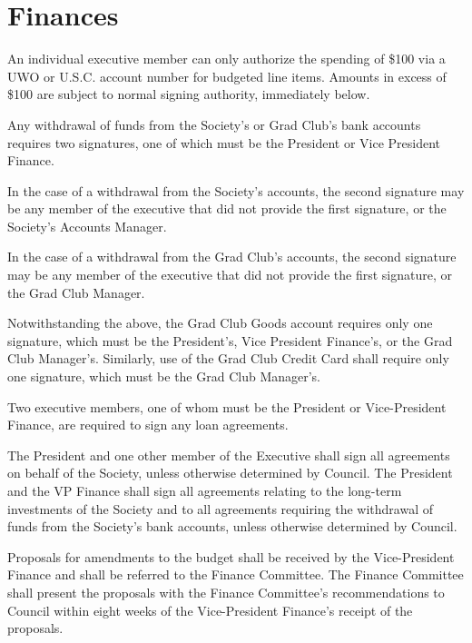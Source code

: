 \section{Finances}
\begin{longenum}[ label*=\thesection.\arabic*., align=left]
	\item An individual executive member can only authorize the spending of \$100 via a  UWO or U.S.C. account number for budgeted line items. Amounts in excess of \$100 are subject to normal signing authority, immediately below.
    \item Any withdrawal of funds from the Society's or Grad Club's bank accounts requires two signatures, one of which must be the President or Vice  President Finance.
    \begin{longenum}[ label*=\arabic*., align=left]
    	\item In the case of a withdrawal from the Society's accounts, the second signature may be any member of the executive that did not provide the first signature, or the Society's Accounts Manager. 
        \item In the case of a withdrawal from the Grad Club's accounts, the second signature may be any member of the executive that did not provide the first signature, or the Grad Club Manager.
    \end{longenum}
    \item Notwithstanding the above, the Grad Club Goods account requires only one signature, which must be the President's, Vice President Finance's, or the Grad Club Manager's. Similarly, use of the Grad Club Credit Card shall require only one signature, which must be the Grad Club Manager's. 
    \item Two executive members, one of whom must be the President or Vice-President Finance, are required to sign any loan agreements.
    \item The President and one other member of the Executive shall sign all agreements on behalf of the Society, unless otherwise determined by Council. The President and the VP Finance shall sign all agreements relating to the long-term investments of the Society and to all agreements requiring the withdrawal of funds from the Society's bank accounts, unless otherwise determined by Council.
    \item Proposals for amendments to the budget shall be received by the Vice-President Finance and shall be referred to the Finance Committee. The Finance Committee shall present the proposals with the Finance Committee's recommendations to Council within eight weeks of the Vice-President Finance's receipt of the proposals.

\end{longenum}
